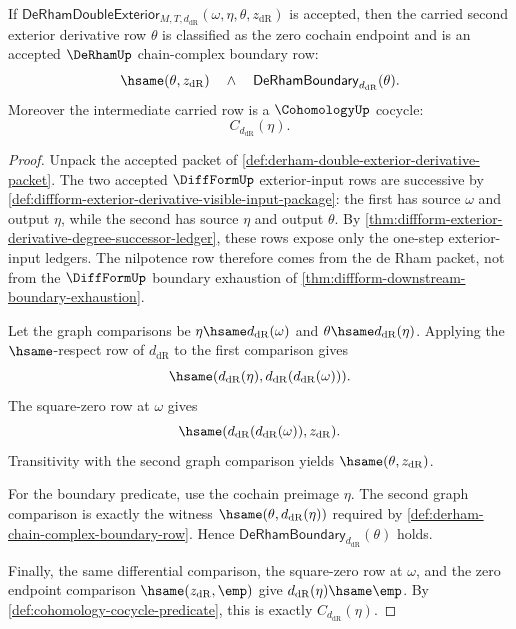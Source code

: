 \begin{theorem}
\label{thm:derham-double-exterior-derivative-boundary}
If
$\mathsf{DeRhamDoubleExterior}_{M,T,d_{\mathrm{dR}}}
(\omega,\eta,\theta,z_{\mathrm{dR}})$ is accepted, then the carried second
exterior derivative row $\theta$ is classified as the zero cochain endpoint
and is an accepted $\DeRhamUp$ chain-complex boundary row:
$$
\hsame(\theta,z_{\mathrm{dR}})
\quad\wedge\quad
\mathsf{DeRhamBoundary}_{d_{\mathrm{dR}}}(\theta).
$$
Moreover the intermediate carried row is a $\CohomologyUp$ cocycle:
$$
C_{d_{\mathrm{dR}}}(\eta).
$$
\end{theorem}
\begin{proof}
Unpack the accepted packet of
\autoref{def:derham-double-exterior-derivative-packet}. The two accepted
$\DiffFormUp$ exterior-input rows are successive by
\autoref{def:diffform-exterior-derivative-visible-input-package}: the first
has source $\omega$ and output $\eta$, while the second has source $\eta$ and
output $\theta$. By \autoref{thm:diffform-exterior-derivative-degree-successor-ledger},
these rows expose only the one-step exterior-input ledgers. The nilpotence row
therefore comes from the de Rham packet, not from the $\DiffFormUp$ boundary
exhaustion of \autoref{thm:diffform-downstream-boundary-exhaustion}.

Let the graph comparisons be
$\eta\hsame d_{\mathrm{dR}}(\omega)$ and
$\theta\hsame d_{\mathrm{dR}}(\eta)$. Applying the $\hsame$-respect row of
$d_{\mathrm{dR}}$ to the first comparison gives
$$
\hsame(d_{\mathrm{dR}}(\eta),d_{\mathrm{dR}}(d_{\mathrm{dR}}(\omega))).
$$
The square-zero row at $\omega$ gives
$$
\hsame(d_{\mathrm{dR}}(d_{\mathrm{dR}}(\omega)),z_{\mathrm{dR}}).
$$
Transitivity with the second graph comparison yields
$\hsame(\theta,z_{\mathrm{dR}})$.

For the boundary predicate, use the cochain preimage $\eta$. The second graph
comparison is exactly the witness
$\hsame(\theta,d_{\mathrm{dR}}(\eta))$ required by
\autoref{def:derham-chain-complex-boundary-row}. Hence
$\mathsf{DeRhamBoundary}_{d_{\mathrm{dR}}}(\theta)$ holds.

Finally, the same differential comparison, the square-zero row at $\omega$,
and the zero endpoint comparison $\hsame(z_{\mathrm{dR}},\emp)$ give
$d_{\mathrm{dR}}(\eta)\hsame\emp$. By
\autoref{def:cohomology-cocycle-predicate}, this is exactly
$C_{d_{\mathrm{dR}}}(\eta)$.
\end{proof}
